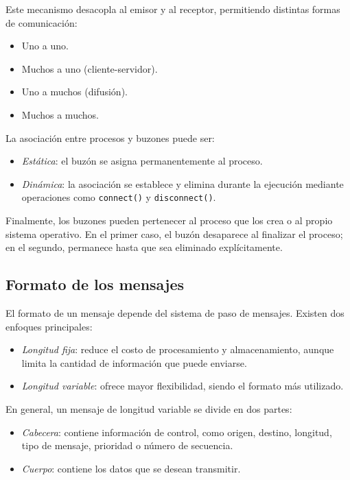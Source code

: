 Este mecanismo desacopla al emisor y al receptor, permitiendo distintas formas de comunicación:
\begin{itemize}
  \item Uno a uno.
  \item Muchos a uno (cliente-servidor).
  \item Uno a muchos (difusión).
  \item Muchos a muchos.
\end{itemize}

La asociación entre procesos y buzones puede ser:
\begin{itemize}
  \item \textit{Estática}: el buzón se asigna permanentemente al proceso.
  \item \textit{Dinámica}: la asociación se establece y elimina durante la ejecución mediante operaciones como \texttt{connect()} y \texttt{disconnect()}.
\end{itemize}

Finalmente, los buzones pueden pertenecer al proceso que los crea o al propio sistema operativo. En el primer caso, el buzón desaparece al finalizar el proceso; en el segundo, permanece hasta que sea eliminado explícitamente.

\subsection{Formato de los mensajes}

El formato de un mensaje depende del sistema de paso de mensajes. Existen dos enfoques principales:
\begin{itemize}
  \item \textit{Longitud fija}: reduce el costo de procesamiento y almacenamiento, aunque limita la cantidad de información que puede enviarse.
  \item \textit{Longitud variable}: ofrece mayor flexibilidad, siendo el formato más utilizado.
\end{itemize}
En general, un mensaje de longitud variable se divide en dos partes:
\begin{itemize}
  \item \textit{Cabecera}: contiene información de control, como origen, destino, longitud, tipo de mensaje, prioridad o número de secuencia.
  \item \textit{Cuerpo}: contiene los datos que se desean transmitir.
\end{itemize}


